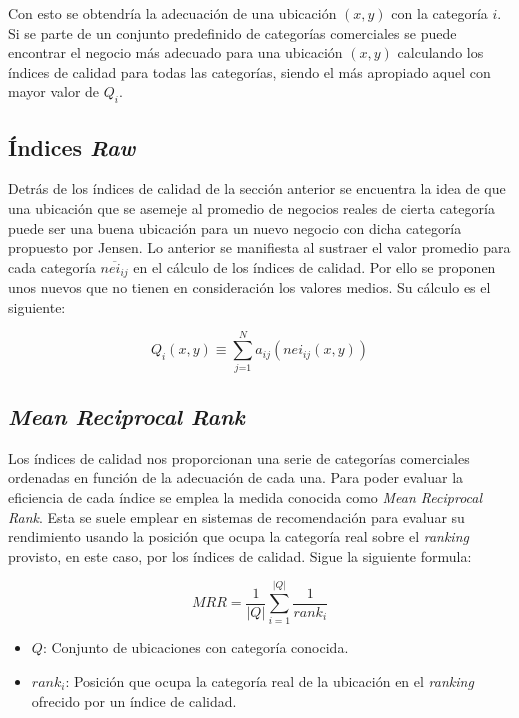 Con esto se obtendría la adecuación de una ubicación $(x,y)$ con la categoría $i$. Si se parte de un conjunto predefinido de categorías comerciales se puede encontrar el negocio más adecuado para una ubicación $(x,y)$ calculando los índices de calidad para todas las categorías, siendo el más apropiado aquel con mayor valor de $Q_i$.

\subsection{Índices \textit{Raw}}

Detrás de los índices de calidad de la sección anterior se encuentra la idea de que una ubicación que se asemeje al promedio de negocios reales de cierta categoría puede ser una buena ubicación para un nuevo negocio con dicha categoría propuesto por Jensen. Lo anterior se manifiesta al sustraer el valor promedio para cada categoría $\overline{nei_{ij}}$ en el cálculo de los índices de calidad. Por ello se proponen unos nuevos que no tienen en consideración los valores medios. Su cálculo es el siguiente:

\begin{equation*}
	Q_i(x,y) \equiv \sum_\textit{j=1}^N a_{ij}  (nei_{ij}(x,y))
\end{equation*}

\subsection{\textit{Mean Reciprocal Rank}}

Los índices de calidad nos proporcionan una serie de categorías comerciales ordenadas en función de la adecuación de cada una. Para poder evaluar la eficiencia de cada índice se emplea la medida conocida como \textit{Mean Reciprocal Rank}. Esta se suele emplear en sistemas de recomendación para evaluar su rendimiento usando la posición que ocupa la categoría real sobre el \textit{ranking} provisto, en este caso, por los índices de calidad. Sigue la siguiente formula:

\begin{equation*}
	MRR = \frac{1}{|Q|}  \sum_{i=1}^{|Q|} \frac{1}{rank_i}
\end{equation*}

\begin{itemize}
	\item $Q$: Conjunto de ubicaciones con categoría conocida.
	\item $rank_i$: Posición que ocupa la categoría real de la ubicación en el \textit{ranking} ofrecido por un índice de calidad.
\end{itemize}


